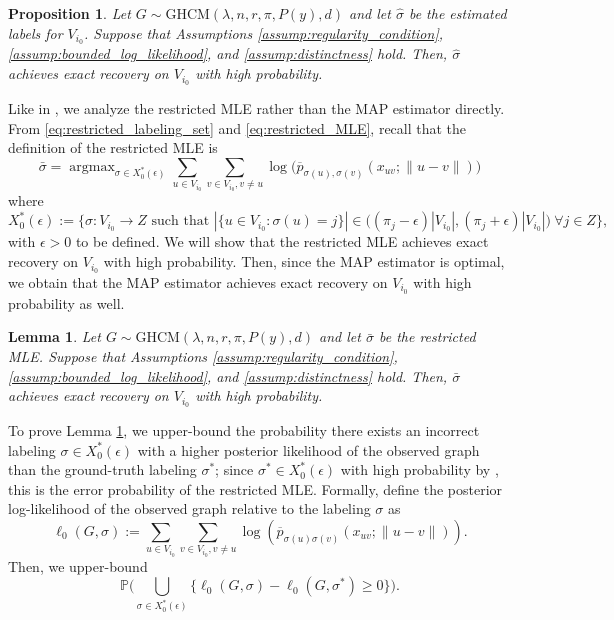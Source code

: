 \documentclass{article}
\DeclareMathOperator*{\argmax}{argmax}
\renewcommand{\P}{\mathbb{P}}
\newcommand{\1}{\mathbbm{1}}
\theoremstyle{definition}
\theoremstyle{plain}
\newtheorem{lemma}{Lemma}
\newtheorem{prop}{Proposition}
\begin{document}
\begin{prop}
\label{prop:MAP}
    Let $G \sim \text{GHCM}(\lambda, n, r, \pi, P(y), d)$ and let $\hat{\sigma}$ be the estimated labels for $V_{i_0}$. Suppose that Assumptions \ref{assump:regularity_condition}, \ref{assump:bounded_log_likelihood}, and \ref{assump:distinctness} hold. Then, $\hat{\sigma}$ achieves exact recovery on $V_{i_0}$ with high probability.
\end{prop}

Like in \cite{Gaudio+2025}, we analyze the restricted MLE rather than the MAP estimator directly. From \eqref{eq:restricted_labeling_set} and \eqref{eq:restricted_MLE}, recall that the definition of the restricted MLE is
\begin{equation*}
    \bar{\sigma} = \argmax_{\sigma \in X_0^*(\epsilon)} \sum_{u \in V_{i_0}} \sum_{v \in V_{i_0}, v \neq u} \log\Big(\overline{p}_{\sigma(u), \sigma(v)}(x_{uv}; \|u -v\|)\Big)
\end{equation*}
where
\begin{equation*}
    X_0^*(\epsilon) := \Big\{\sigma : V_{i_0} \to Z \text{ such that } |\{u \in V_{i_0} : \sigma(u) = j\}| \in \Big((\pi_j - \epsilon)|V_{i_0}|, (\pi_j + \epsilon)|V_{i_0}|\Big) \: \forall j \in Z\Big\},
\end{equation*}
with $\epsilon > 0$ to be defined. We will show that the restricted MLE achieves exact recovery on $V_{i_0}$ with high probability. Then, since the MAP estimator is optimal, we obtain that the MAP estimator achieves exact recovery on $V_{i_0}$ with high probability as well.

\begin{lemma}
\label{lem:restricted_MLE_lemma}
    Let $G \sim \text{GHCM}(\lambda, n, r, \pi, P(y), d)$ and let $\bar{\sigma}$ be the restricted MLE. Suppose that Assumptions \ref{assump:regularity_condition}, \ref{assump:bounded_log_likelihood}, and \ref{assump:distinctness} hold. Then, $\bar{\sigma}$ achieves exact recovery on $V_{i_0}$ with high probability.
\end{lemma}

To prove Lemma \ref{lem:restricted_MLE_lemma}, we upper-bound the probability there exists an incorrect labeling $\sigma \in X_0^*(\epsilon)$ with a higher posterior likelihood of the observed graph than the ground-truth labeling $\sigma^*$; since $\sigma^* \in X_0^*(\epsilon)$ with high probability by \cite[Lemma D.3]{Gaudio+2025}, this is the error probability of the restricted MLE. Formally, define the posterior log-likelihood of the observed graph relative to the labeling $\sigma$ as
\begin{equation*}
    \ell_0(G, \sigma) := \sum_{u \in V_{i_0}} \sum_{v \in V_{i_0}, v \neq u} \log(\overline{p}_{\sigma(u)\sigma(v)}(x_{uv}; \|u - v\|)).
\end{equation*}
Then, we upper-bound
\begin{equation}
\label{eq:restricted_MLE_fail_prob}
    \P\bigg( \bigcup_{\sigma \in X_0^*(\epsilon)} \{\ell_0(G, \sigma) - \ell_0(G, \sigma^*) \geq 0\} \bigg).
\end{equation}
\end{document}
